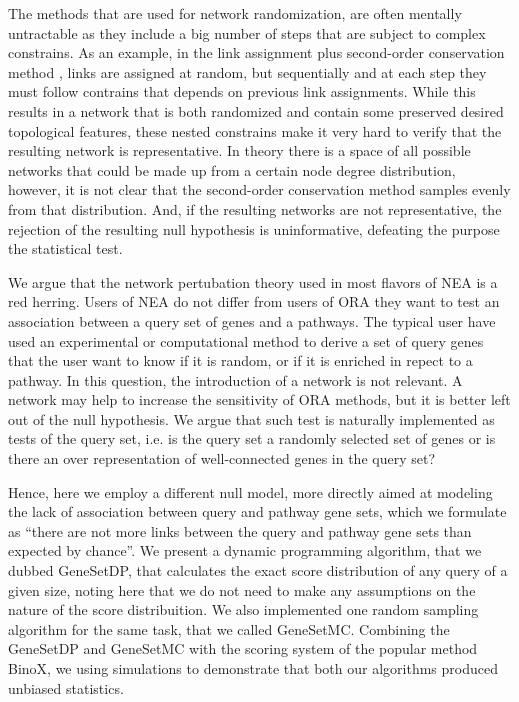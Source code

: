 \documentclass[10pt,letterpaper]{article}
\begin{document}
The methods that are used for network randomization, are often mentally untractable as they include a big number of steps that are subject to complex constrains.
As an example, in the link assignment plus second-order conservation method \cite{mccormack2013statistical}, links are assigned at random, but sequentially and at each step they must follow contrains that depends on previous link assignments.
While this results in a network that is both randomized and contain some preserved desired topological features, these nested constrains make it very hard to verify that the resulting network is representative. In theory there is a space of all possible networks that could be made up from a certain node degree distribution, however, it is not clear that the  second-order conservation method samples evenly from that distribution.  And, if the resulting networks are not representative, the rejection of the resulting null hypothesis is uninformative, defeating the purpose the statistical test.

We argue that the network pertubation theory used in most flavors of NEA is a red herring. Users of NEA do not differ from users of ORA they want to test an association between a query set of genes and a pathways.  The typical user have used an experimental or computational method to derive a set of query genes that the user want to know if it is random, or if it is enriched in repect to a pathway.  In this question, the introduction of a  network is not relevant. A network may help to increase the sensitivity of ORA methods, but it is better left out of the null hypothesis. We argue that such test is naturally implemented as tests of the query set, i.e. is the query set a randomly selected set of genes or is there an over representation of well-connected genes in the query set?

Hence, here we employ a different null model, more directly aimed at modeling the lack of association between query and pathway gene sets, which we formulate as ``there are not more links between the query and pathway gene sets than expected by chance''. We present a dynamic programming algorithm, that we dubbed GeneSetDP, that calculates the exact score distribution of any query of a given size, noting here that we do not need to make any assumptions on the nature of the score distribuition. We also implemented one random sampling algorithm for the same task, that we called GeneSetMC.
Combining the GeneSetDP and  GeneSetMC with the scoring system of the popular method BinoX, we using simulations to demonstrate that both our algorithms produced unbiased statistics.
\end{document}
